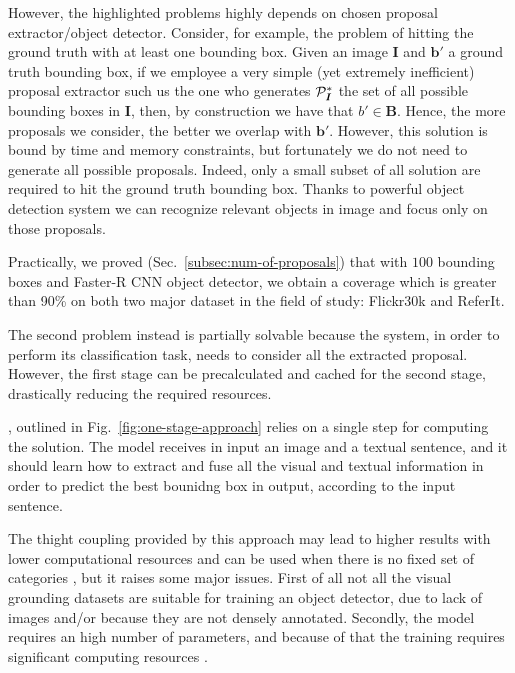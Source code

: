 However, the highlighted problems highly depends on chosen proposal
extractor/object detector. Consider, for example, the problem of
hitting the ground truth with at least one bounding box. Given an
image $\bm{I}$ and $\bm{b}'$ a ground truth bounding box, if we
employee a very simple (yet extremely inefficient) proposal extractor
such us the one who generates $\mathcal{P}^*_{\bm{I}}$ the set of all
possible bounding boxes in $\bm{I}$, then, by construction we have
that $b' \in \bm{B}$. Hence, the more proposals we consider, the
better we overlap with $\bm{b}'$. However, this solution is bound by
time and memory constraints, but fortunately we do not need to
generate all possible proposals. Indeed, only a small subset of all
solution are required to hit the ground truth bounding box. Thanks to
powerful object detection system we can recognize relevant objects in
image and focus only on those proposals.

Practically, we proved (Sec.~\ref{subsec:num-of-proposals}) that with
$100$ bounding boxes and Faster-R CNN object detector, we obtain a
coverage which is greater than 90\% on both two major dataset in the
field of study: Flickr30k and ReferIt.

The second problem instead is partially solvable because the system,
in order to perform its classification task, needs to consider all the
extracted proposal. However, the first stage can be precalculated and
cached for the second stage, drastically reducing the required
resources. 

, outlined in
Fig.~\ref{fig:one-stage-approach} relies on a single step for
computing the solution. The model receives in input an image and a
textual sentence, and it should learn how to extract and fuse all the
visual and textual information in order to predict the best bounidng
box in output, according to the input sentence. 

The thight coupling provided by this approach may lead to higher
results with lower computational resources \cite{yang2019fast} and can
be used when there is no fixed set of categories \cite{sadhu2019zero},
but it raises some major issues. First of all not all the visual
grounding datasets are suitable for training an object detector, due
to lack of images and/or because they are not densely annotated.
Secondly, the model requires an high number of parameters, and because
of that the training requires significant computing resources
\cite{rigoni2021better}.

